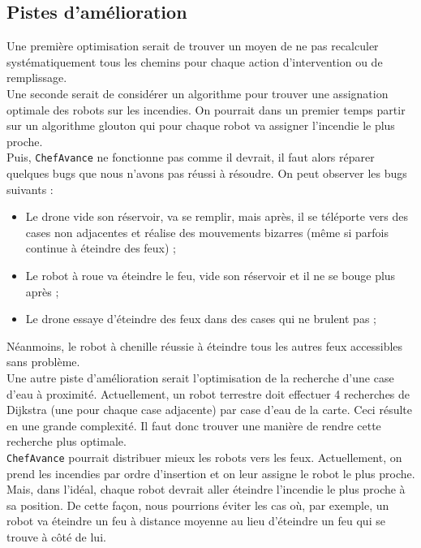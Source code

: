 \documentclass[a4paper,8pt]{article} %
\begin{document}
\subsection{Pistes d'amélioration}
Une première optimisation serait de trouver un moyen de ne pas recalculer systématiquement tous les chemins pour chaque action d'intervention ou de remplissage.\\

Une seconde serait de considérer un algorithme pour trouver une assignation optimale des robots sur les incendies. On pourrait dans un premier temps partir sur un algorithme glouton qui pour chaque robot va assigner l'incendie le plus proche.\\

Puis, \texttt{ChefAvance} ne fonctionne pas comme il devrait, il faut alors réparer quelques bugs que nous n'avons pas réussi à résoudre. On peut observer les bugs suivants :

\begin{itemize}
    \item Le drone vide son réservoir, va se remplir, mais après, il se téléporte vers des cases non adjacentes et réalise des mouvements bizarres (même si parfois continue à éteindre des feux) ;
    \item Le robot à roue va éteindre le feu, vide son réservoir et il ne se bouge plus après ;
    \item Le drone essaye d'éteindre des feux dans des cases qui ne brulent pas ;
\end{itemize}

Néanmoins, le robot à chenille réussie à éteindre tous les autres feux accessibles sans problème.\\

Une autre piste d'amélioration serait l'optimisation de la recherche d'une case d'eau à proximité. Actuellement, un robot terrestre doit effectuer 4 recherches de Dijkstra (une pour chaque case adjacente) par case d'eau de la carte. Ceci résulte en une grande complexité. Il faut donc trouver une manière de rendre cette recherche plus optimale. \\

\texttt{ChefAvance} pourrait distribuer mieux les robots vers les feux. Actuellement, on prend les incendies par ordre d'insertion et on leur assigne le robot le plus proche. Mais, dans l'idéal, chaque robot devrait aller éteindre l'incendie le plus proche à sa position. De cette façon, nous pourrions éviter les cas où, par exemple, un robot va éteindre un feu à distance moyenne au lieu d'éteindre un feu qui se trouve à côté de lui.
\end{document}
